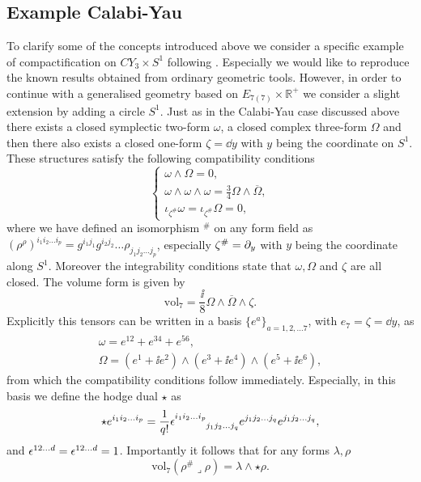 \subsection{Example Calabi-Yau}
To clarify some of the concepts introduced above we consider a specific example of compactification on $CY_3\times S^1$ following \cite{Ashmore:2015joa}. Especially we would like to reproduce the known results obtained from ordinary geometric tools. However, in order to continue with a generalised geometry based on $E_{7(7)}\times \mathbb{R}^+$ we consider a slight extension by adding a circle $S^1$. Just as in the Calabi-Yau case discussed above there exists a closed symplectic two-form $\omega$, a closed complex three-form $\Omega$ and then there also exists a closed one-form $\zeta=\dd y$ with $y$ being the coordinate on $S^1$. These structures satisfy the following compatibility conditions 
\begin{equation}
    \begin{cases}
        \omega\wedge\Omega = 0,\\
        \omega\wedge\omega\wedge\omega = \frac{3}{4}\Omega\wedge\overbar{\Omega},\\
        \iota_{\zeta^{\#}}\omega = \iota_{\zeta^{\#}}\Omega = 0,
    \end{cases}
\end{equation}
where we have defined an isomorphism $^{\#}$ on any form field as $(\rho^{\rho})^{i_1i_2\ldots i_p}=g^{i_1j_1}g^{i_2j_2}\ldots\rho_{j_1j_2\ldots j_p}$, especially $\zeta^{\#}=\partial_y$ with $y$ being the coordinate along $S^1$. Moreover the integrability conditions state that $\omega,\Omega$ and $\zeta$ are all closed. The volume form is given by 
\begin{equation}
    \text{vol}_7 = \frac{\ii}{8}\Omega\wedge\overbar{\Omega}\wedge \zeta. 
\end{equation}
Explicitly this tensors can be written in a basis $\{e^a\}_{a=1,2,\ldots 7}$, with $e_7=\zeta=\dd y$, as 
\begin{equation}
    \begin{aligned}\label{eq:Frame}
        \omega = e^{12}+e^{34}+e^{56},\\
        \Omega = (e^1+\ii e^{2})\wedge(e^3+\ii e^{4})\wedge(e^5+\ii e^{6}),
    \end{aligned}
\end{equation}
from which the compatibility conditions follow immediately. Especially, in this basis we define the hodge dual $\star$ as 
\begin{equation}
    \star e^{i_1i_2\ldots i_p} = \frac{1}{q!}\tensor{\epsilon}{^{i_1i_2\ldots i_p}_{j_1j_2\ldots j_q}}e^{j_1j_2\ldots j_q}e^{j_1j_2\ldots j_q},
\end{equation}
and $\tensor{\epsilon}{^{12\ldots d}}=\tensor{\epsilon}{^{12\ldots d}}=1$. Importantly it follows that for any forms $\lambda,\rho$
\begin{equation}
    \text{vol}_7(\rho^{\#}\lrcorner \rho) = \lambda\wedge\star\rho.
\end{equation}

